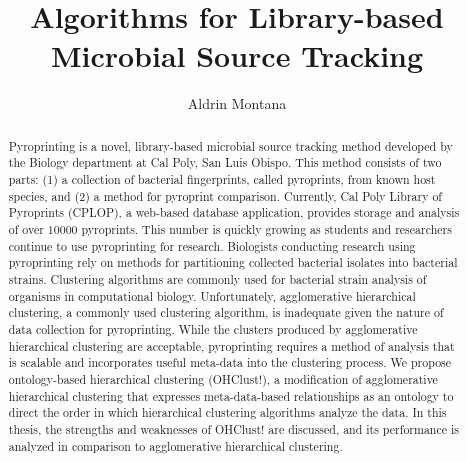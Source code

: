 \documentclass[12pt]{ucthesis}
\begin{document}
\title{Algorithms for Library-based Microbial Source Tracking}
\author{Aldrin Montana}



\maketitle
\begin{frontmatter}
   \copyrightpage

   \committeemembershippage

   \begin{abstract}
      Pyroprinting is a novel, library-based microbial source tracking method
      developed by the Biology department at Cal Poly, San Luis Obispo. This
      method consists of two parts: (1) a collection of bacterial fingerprints,
      called pyroprints, from known host species, and (2) a method for
      pyroprint comparison. Currently, Cal Poly Library of Pyroprints (CPLOP),
      a web-based database application, provides storage and analysis of over
      $10000$ pyroprints. This number is quickly growing as students and
      researchers continue to use pyroprinting for research. Biologists
      conducting research using pyroprinting rely on methods for partitioning
      collected bacterial isolates into bacterial strains. Clustering
      algorithms are commonly used for bacterial strain analysis of organisms
      in computational biology. Unfortunately, \textsf{agglomerative
      hierarchical clustering}, a commonly used clustering algorithm, is
      inadequate given the nature of data collection for pyroprinting. While
      the clusters produced by \textsf{agglomerative hierarchical
      clustering} are acceptable, pyroprinting requires a method of analysis
      that is scalable and incorporates useful meta-data into the clustering
      process. We propose ontology-based hierarchical clustering
      (\textsf{OHClust!}), a modification of \textsf{agglomerative hierarchical
      clustering} that expresses meta-data-based relationships as an ontology
      to direct the order in which hierarchical clustering algorithms analyze
      the data. In this thesis, the strengths and weaknesses of
      \textsf{OHClust!} are discussed, and its performance is analyzed
      in comparison to \textsf{agglomerative hierarchical clustering}.
   \end{abstract}


\end{frontmatter}
\end{document}
